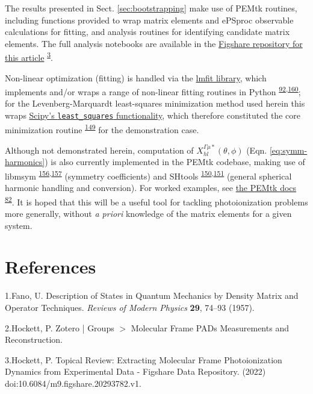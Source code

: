 \documentclass[10pt]{article}
\begin{document}
The results presented in Sect. \ref{sec:bootstrapping} make use of PEMtk routines, including functions provided to wrap matrix elements and ePSproc observable calculations for fitting, and analysis routines for identifying candidate matrix elements. The full analysis notebooks are available in the \href{http://dx.doi.org/10.6084/m9.figshare.20293782}{Figshare repository for this article} \textsuperscript{\hyperref[csl:3]{3}}.

Non-linear optimization (fitting) is handled via the \href{https://lmfit.github.io/lmfit-py/index.html}{lmfit library}, which implements and/or wraps a range of non-linear fitting routines in Python \textsuperscript{\hyperref[csl:92]{92},\hyperref[csl:160]{160}}; for the Levenberg-Marquardt least-squares minimization method used herein this wraps \href{https://docs.scipy.org/doc/scipy/reference/generated/scipy.optimize.least_squares.html}{Scipy's \verb+least_squares+  functionality}, which therefore constituted the core minimization routine \textsuperscript{\hyperref[csl:149]{149}} for the demonstration case.

Although not demonstrated herein, computation of $X_{hl}^{\Gamma\mu*}(\theta,\phi)$ (Eqn. \ref{eq:symm-harmonics}) is also currently implemented in the PEMtk codebase, making use of libmsym \textsuperscript{\hyperref[csl:156]{156},\hyperref[csl:157]{157}} (symmetry coefficients) and SHtools \textsuperscript{\hyperref[csl:150]{150},\hyperref[csl:151]{151}} (general spherical harmonic handling and conversion). For worked examples, see \href{https://pemtk.readthedocs.io/en/latest/sym/pemtk_symHarm_demo_160322_tidy.html}{the PEMtk docs} \textsuperscript{\hyperref[csl:82]{82}}. It is hoped that this will be a useful tool for tackling photoionization problems more generally, without \textit{a priori} knowledge of the matrix elements for a given system.

\FloatBarrier
\section*{References}\sloppy
{}
\label{csl:1}1.Fano, U. {Description of {{States}} in {{Quantum Mechanics}} by {{Density Matrix}} and {{Operator Techniques}}}. \textit{Reviews of Modern Physics} \textbf{29}, 74–93 (1957).

\label{csl:2}2.Hockett, P. {Zotero | {{Groups}} {$>$} {{Molecular Frame PADs Measurements}} and {{Reconstruction}}}.

\label{csl:3}3.Hockett, P. {Topical {{Review}}: {{Extracting Molecular Frame Photoionization Dynamics}} from {{Experimental Data}} - {{Figshare}} Data Repository}. (2022) doi:10.6084/m9.figshare.20293782.v1.
\end{document}
